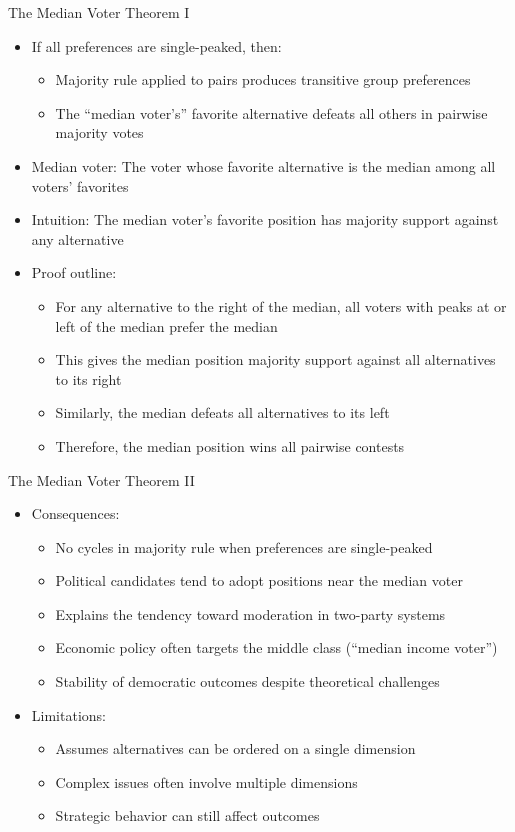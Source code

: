 \documentclass[10pt]{beamer}
\begin{document}
\begin{frame}{The Median Voter Theorem I}
  \begin{itemize}[<+->]
    \item If all preferences are single-peaked, then:
      \begin{itemize}
        \item Majority rule applied to pairs produces transitive group preferences
        \item The ``median voter's'' favorite alternative defeats all others in pairwise majority votes
      \end{itemize}
    \item Median voter: The voter whose favorite alternative is the median among all voters' favorites
    \item Intuition: The median voter's favorite position has majority support against any alternative
    \item Proof outline:
      \begin{itemize}
        \item For any alternative to the right of the median, all voters with peaks at or left of the median prefer the median
        \item This gives the median position majority support against all alternatives to its right
        \item Similarly, the median defeats all alternatives to its left
        \item Therefore, the median position wins all pairwise contests
      \end{itemize}
  \end{itemize}
\end{frame}

\begin{frame}{The Median Voter Theorem II}
  \begin{itemize}[<+->]
    \item Consequences:
      \begin{itemize}
        \item No cycles in majority rule when preferences are single-peaked
        \item Political candidates tend to adopt positions near the median voter
        \item Explains the tendency toward moderation in two-party systems
        \item Economic policy often targets the middle class (``median income voter'')
        \item Stability of democratic outcomes despite theoretical challenges
      \end{itemize}
    \item Limitations:
      \begin{itemize}
        \item Assumes alternatives can be ordered on a single dimension
        \item Complex issues often involve multiple dimensions
        \item Strategic behavior can still affect outcomes
      \end{itemize}
  \end{itemize}
\end{frame}
\end{document}

